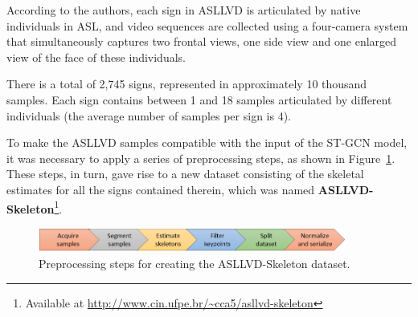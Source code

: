 According to the authors, each sign in ASLLVD is articulated by native individuals in ASL, and video sequences are collected using a four-camera system that simultaneously captures two frontal views, one side view and one enlarged view of the face of these individuals. %

    

There is a total of 2,745 signs, represented in approximately 10 thousand samples. Each sign contains between 1 and 18 samples articulated by different individuals (the average number of samples per sign is 4).


To make the ASLLVD samples compatible with the input of the ST-GCN model, it was necessary to apply a series of preprocessing steps, as shown in Figure~\ref{fig:preprocessamento}. These steps, in turn, gave rise to a new dataset consisting of the skeletal estimates for all the signs contained therein, which was named \textbf{ASLLVD-Skeleton}\footnote{
   Available at \url{http://www.cin.ufpe.br/~cca5/asllvd-skeleton}
}.

\begin{figure}[ht!]
    \centering
    \includegraphics[width=0.9\textwidth]{images/dataset_preprocessing_en}
    \caption{Preprocessing steps for creating the ASLLVD-Skeleton dataset.}
    \label{fig:preprocessamento}
\end{figure}

